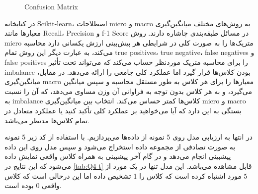 \documentclass{article}
\begin{document}
\begin{figure}[H] 
	\centering
	\caption{Confusion Matrix}
	\label{fig: Q4 cm}
\end{figure}

در کتابخانه
 Scikit-learn،
 اصطلاحات 
 micro
  و 
  macro
   به روش‌های مختلف میانگین‌گیری معیارها مانند
   Recall، Precision و  f-1 Score
   در مسائل طبقه‌بندی چاشاره دارند. روش micro متریک‌ها را به صورت کلی در شرایطی هر پیش‌بینی ارزش یکسانی دارد محاسبه می‌کند، به عبارت دیگر این روش تمام 
   true positives، true negative، false negatives و false positives 
   را برای محاسبه متریک موردنظر حساب می‌کند
   که می‌تواند تحت تأثیر 
   imbalance
    بودن کلاس‌ها قرار گیرد اما عملکرد کلی جامعی را ارائه می‌دهد. در مقابل، میانگین‌گیری
    macro
     معیارها را برای هر کلاس به طور مستقل محاسبه و سپس میانگین می‌گیرد، و به هر کلاس بدون توجه به فراوانی آن وزن مساوی می‌دهد، که آن را نسبت به
     imbalance
      کلاس‌ها کمتر حساس می‌کند. انتخاب بین میانگین‌گیری micro و macro بستگی به این دارد که آیا می‌خواهید بر عملکرد کلی تأکید کنید یا عملکرد متعادل در تمام کلاس‌ها مدنظر می‌باشد.

در انتها به ارزیابی مدل روی 5 نمونه از داده‌ها می‌پردازیم. با استفاده از کد زیر 5 نمونه به صورت تصادفی از مجموعه داده استخراج می‌شود و سپس مدل روی این داده پیشبینی انجام می‌دهد و در گام آخر پیشبینی به همراه کلاس واقعی نمایش داده می‌شود که این نتایج در 
\autoref{tab:Q4 t}
قابل مشاهده می‌باشد. این مدل تنها در یک مورد از 5 مورد اشتباه کرده است که کلاس را 1 تشخیص داده اما این درحالی است که کلاس واقعی 0 بوده است.
\end{document}
